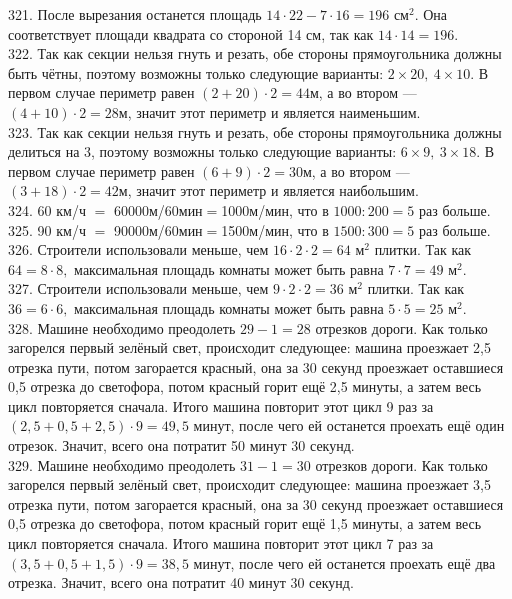 321. После вырезания останется площадь $14\cdot22-7\cdot16=196\text{ см}^2.$ Она соответствует площади квадрата со стороной 14 см, так как $14\cdot 14=196.$\\
322. Так как секции нельзя гнуть и резать, обе стороны прямоугольника должны быть чётны, поэтому возможны только следующие варианты: $2\times20,\ 4\times10.$  В первом случае периметр равен $(2+20)\cdot2=44$м, а во втором --- $(4+10)\cdot2=28$м, значит этот периметр и является наименьшим.\\
323. Так как секции нельзя гнуть и резать, обе стороны прямоугольника должны делиться на 3, поэтому возможны только следующие варианты: $6\times9,\ 3\times18.$ В первом случае периметр равен $(6+9)\cdot2=30$м, а во втором --- $(3+18)\cdot2=42$м, значит этот периметр и является наибольшим.\\
324. 60 км/ч $=$ 60000м/60мин$=$1000м/мин, что в $1000:200=5$ раз больше.\\
325. 90 км/ч $=$ 90000м/60мин$=$1500м/мин, что в $1500:300=5$ раз больше.\\
326. Строители использовали меньше, чем $16\cdot2\cdot2=64\text{ м}^2$ плитки. Так как $64=8\cdot8,$ максимальная площадь комнаты может быть равна $7\cdot7=49\text{ м}^2.$\\
327. Строители использовали меньше, чем $9\cdot2\cdot2=36\text{ м}^2$ плитки. Так как $36=6\cdot6,$ максимальная площадь комнаты может быть равна $5\cdot5=25\text{ м}^2.$\\
328. Машине необходимо преодолеть $29-1=28$ отрезков  дороги. Как только загорелся первый зелёный свет, происходит следующее: машина проезжает 2,5 отрезка пути, потом загорается красный, она за 30 секунд проезжает оставшиеся 0,5 отрезка до светофора, потом красный горит ещё 2,5 минуты, а затем весь цикл повторяется сначала. Итого машина повторит этот цикл 9 раз за $(2,5+0,5+2,5)\cdot9=49,5$ минут, после чего ей останется проехать ещё один отрезок. Значит, всего она потратит 50 минут 30 секунд.\\
329. Машине необходимо преодолеть $31-1=30$ отрезков  дороги. Как только загорелся первый зелёный свет, происходит следующее: машина проезжает 3,5 отрезка пути, потом загорается красный, она за 30 секунд проезжает оставшиеся 0,5 отрезка до светофора, потом красный горит ещё 1,5 минуты, а затем весь цикл повторяется сначала. Итого машина повторит этот цикл 7 раз за $(3,5+0,5+1,5)\cdot9=38,5$ минут, после чего ей останется проехать ещё два отрезка. Значит, всего она потратит 40 минут 30 секунд.\\
